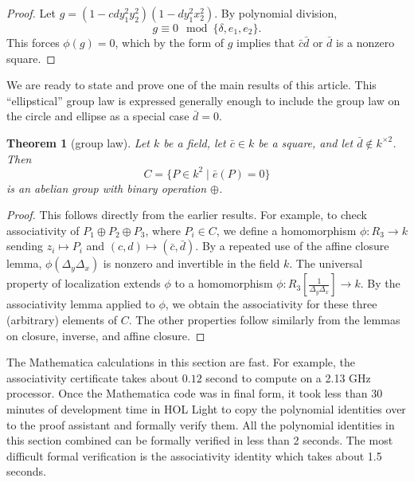 \documentclass[12pt]{article}
\newtheorem{theorem}{Theorem}[subsection]
\newcommand{\f}[1]{\frac{1}{#1}}
\def\cong{\equiv}
\begin{document}
\begin{proof} 
  Let $g = (1 - c d y_1^2 y_2 ^2) (1 - d y_1^2 x_2^2)$.  By polynomial
  division,
\begin{equation}\label{eqn:squares}
  g \cong 0 \mod \{\delta,e_1,e_2\}.
\end{equation}
This forces $\phi(g)=0$, which by the form of $g$ implies that $\bar
c\bar d$ or $\bar d$ is a nonzero square.
\end{proof}

We are ready to state and prove one of the main results of this
article.  This ``ellipstical'' group law is expressed generally enough
to include the group law on the circle and ellipse as a special case 
$\bar d = 0$.

\begin{theorem}[group law]\label{thm:group} 
  Let $k$ be a field, let $\bar c \in k$ be a square, and let $\bar
  d\not\in k^{\times 2}$.  
  Then 
  \[
  C= \{P\in k^2 \mid \bar e(P) = 0\}
  \]
   is an abelian
  group with binary operation $\oplus$.
\end{theorem}

\begin{proof} This follows directly from the earlier results.  For
  example, to check associativity of $P_1\oplus P_2\oplus P_3$,
  where $P_i\in C$, we define a homomorphism
  $\phi:R_3\to k$ sending $z_i\mapsto P_i$ and
  $(c,d)\mapsto (\bar c,\bar d)$.  By a repeated use of the affine
  closure lemma, $\phi(\Delta_y\Delta_x)$ is nonzero and invertible in
  the field $k$.  The universal property of localization extends
  $\phi$ to a homomorphism $\phi:R_3[\f{\Delta_y\Delta_x}]\to k$.  By
  the associativity lemma applied to $\phi$, we obtain the
  associativity for these three (arbitrary) elements of $C$.  The
  other properties follow similarly from the lemmas on closure,
  inverse, and affine closure.
\end{proof}

The Mathematica calculations in this section are fast. For example,
the associativity certificate takes about $0.12$ second to compute on
a 2.13 GHz processor.  Once the Mathematica code was in final form, it
took less than 30 minutes of development time in HOL Light to copy the
polynomial identities over to the proof assistant and formally verify
them.  All the polynomial identities in this section combined can be
formally verified in less than 2 seconds. The most difficult formal
verification is the associativity identity which takes about 1.5
seconds.
\end{document}

